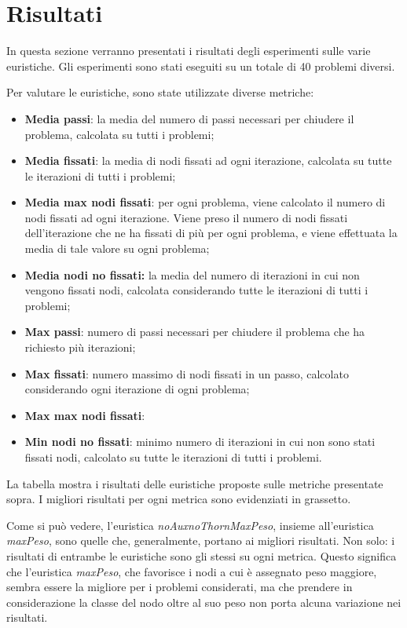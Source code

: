 \section{Risultati}
\label{sec:risultati}

In questa sezione verranno presentati i risultati degli esperimenti sulle varie euristiche. Gli esperimenti sono stati eseguiti su un totale di 40 problemi diversi. 

Per valutare le euristiche, sono state utilizzate diverse metriche:

\begin{itemize}
\item \textbf{Media passi}: la media del numero di passi necessari per chiudere il problema, calcolata su tutti i problemi;
\item \textbf{Media fissati}: la media di nodi fissati ad ogni iterazione, calcolata su tutte le iterazioni di tutti i problemi;
\item \textbf{Media max nodi fissati}: per ogni problema, viene calcolato il numero di nodi fissati ad ogni iterazione. Viene preso il numero di nodi fissati dell'iterazione che ne ha fissati di più per ogni problema, e viene effettuata la media di tale valore su ogni problema;
\item \textbf{Media nodi no fissati:} la media del numero di iterazioni in cui non vengono fissati nodi, calcolata considerando tutte le iterazioni di tutti i problemi;
\item \textbf{Max passi}: numero di passi necessari per chiudere il problema che ha richiesto più iterazioni;
\item \textbf{Max fissati}: numero massimo di nodi fissati in un passo, calcolato considerando ogni iterazione di ogni problema;
\item \textbf{Max max nodi fissati}:
\item \textbf{Min nodi no fissati}: minimo numero di iterazioni in cui non sono stati fissati nodi, calcolato su tutte le iterazioni di tutti i problemi.
\end{itemize}

La tabella mostra i risultati delle euristiche proposte sulle metriche presentate sopra. I migliori risultati per ogni metrica sono evidenziati in grassetto. 

Come si può vedere, l'euristica \textit{noAuxnoThornMaxPeso}, insieme all'euristica \textit{maxPeso}, sono quelle che, generalmente, portano ai migliori risultati. Non solo: i risultati di entrambe le euristiche sono gli stessi su ogni metrica. Questo significa che l'euristica \textit{maxPeso}, che favorisce i nodi a cui è assegnato peso maggiore, sembra essere la migliore per i problemi considerati, ma che prendere in considerazione la classe del nodo oltre al suo peso non porta alcuna variazione nei risultati.

